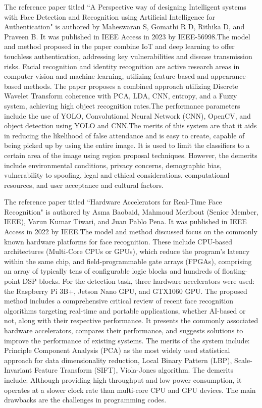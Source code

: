 \documentclass[12pt,a4paper]{report}
\begin{document}
\par The reference paper titled ``A Perspective way of designing Intelligent systems with Face Detection and Recognition using Artificial Intelligence for Authentication" is authored by Maheswaran S, Gomathi R D, Rithika D, and Praveen B. It was published in IEEE Access in 2023 by IEEE-56998.The model and method proposed in the paper combine IoT and deep learning to offer touchless authentication, addressing key vulnerabilities and disease transmission risks. Facial recognition and identity recognition are active research areas in computer vision and machine learning, utilizing feature-based and appearance-based methods. The paper proposes a combined approach utilizing Discrete Wavelet Transform coherence with PCA, LDA, CNN, entropy, and a Fuzzy system, achieving high object recognition rates.The performance parameters include the use of YOLO, Convolutional Neural Network (CNN), OpenCV, and object detection using YOLO and CNN.The merits of this system are that it aids in reducing the likelihood of false attendance and is easy to create, capable of being picked up by using the entire image. It is used to limit the classifiers to a certain area of the image using region proposal techniques. However, the demerits include environmental conditions, privacy concerns, demographic bias, vulnerability to spoofing, legal and ethical considerations, computational resources, and user acceptance and cultural factors.\\
\par The reference paper titled ``Hardware Accelerators for Real-Time Face Recognition" is authored by Asma Baobaid, Mahmoud Meribout (Senior Member, IEEE), Varun Kumar Tiwari, and Juan Pablo Pena. It was published in IEEE Access in 2022 by IEEE.The model and method discussed focus on the commonly known hardware platforms for face recognition. These include CPU-based architectures (Multi-Core CPUs or GPUs), which reduce the program's latency within the same chip, and field-programmable gate arrays (FPGAs), comprising an array of typically tens of configurable logic blocks and hundreds of floating-point DSP blocks. For the detection task, three hardware accelerators were used: the Raspberry Pi 3B+, Jetson Nano GPU, and GTX1060 GPU. The proposed method includes a comprehensive critical review of recent face recognition algorithms targeting real-time and portable applications, whether AI-based or not, along with their respective performance. It presents the commonly associated hardware accelerators, compares their performance, and suggests solutions to improve the performance of existing systems. The merits of the system include: Principle Component Analysis (PCA) as the most widely used statistical approach for data dimensionality reduction, Local Binary Pattern (LBP), Scale-Invariant Feature Transform (SIFT), Viola-Jones algorithm. The demerits include: Although providing high throughput and low power consumption, it operates at a slower clock rate than multi-core CPU and GPU devices. The main drawbacks are the challenges in programming codes.\\
\end{document}
